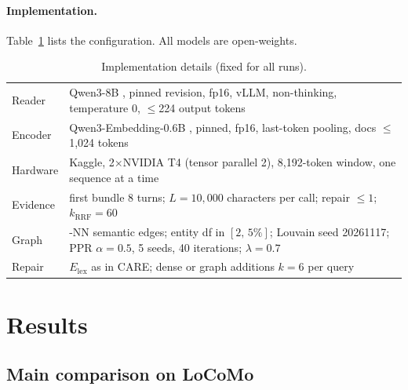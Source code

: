 \documentclass[10pt]{article}
\theoremstyle{plain}
\theoremstyle{definition}
\newcommand{\care}{\textsc{CARE}}
\begin{document}
\paragraph{Implementation.} Table~\ref{tab:impl} lists the configuration. All models are open-weights.

\begin{table}[t]
\centering
\caption{Implementation details (fixed for all runs).}
\label{tab:impl}
\small
\begin{tabular}{l>{\raggedright\arraybackslash}p{13.4cm}}
\toprule
Reader & Qwen3-8B \citep{yang2025qwen3}, pinned revision, fp16, vLLM, non-thinking, temperature 0, $\le$224 output tokens \\
Encoder & Qwen3-Embedding-0.6B \citep{zhang2025qwen3embedding}, pinned, fp16, last-token pooling, docs $\le$1,024 tokens \\
Hardware & Kaggle, 2$\times$NVIDIA T4 (tensor parallel 2), 8,192-token window, one sequence at a time \\
Evidence & first bundle 8 turns; $L=10{,}000$ characters per call; repair $\le 1$; $k_{\mathrm{RRF}}=60$ \\
Graph & 5-NN semantic edges; entity df in $[2,\,5\%]$; Louvain seed 20261117; PPR $\alpha=0.5$, 5 seeds, 40 iterations; $\lambda=0.7$ \\
Repair & $E_{\mathrm{lex}}$ as in \care{}; dense or graph additions $k=6$ per query \\
\bottomrule
\end{tabular}
\end{table}

\section{Results}
\label{sec:results}

\subsection{Main comparison on LoCoMo}
\label{sec:main}
\end{document}
